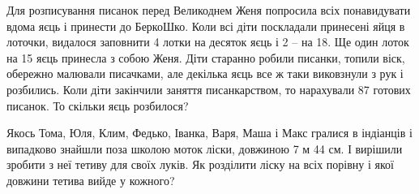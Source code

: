 \problem
Для розписування писанок перед Великоднем Женя попросила всіх понавидувати
вдома яєць і принести до БеркоШко. Коли всі діти поскладали принесені яйця
в лоточки, видалося заповнити 4 лотки на десяток яєць і 2 – на 18.
Ще один лоток на 15 яєць принесла з собою Женя.
Діти старанно робили писанки, топили віск, обережно малювали писачками,
але декілька яєць все ж таки виковзнули з рук і розбились.
Коли діти закінчили заняття писанкарством, то нарахували 87 готових писанок.
То скільки яєць розбилося?


\problem
Якось Тома, Юля, Клим, Федько, Іванка, Варя, Маша і Макс гралися
в індіанців і випадково знайшли поза школою моток ліски, довжиною 7 м 44 см.
І вирішили зробити з неї тетиву для своїх луків.
Як розділити ліску на всіх порівну і якої довжини тетива вийде у кожного?
